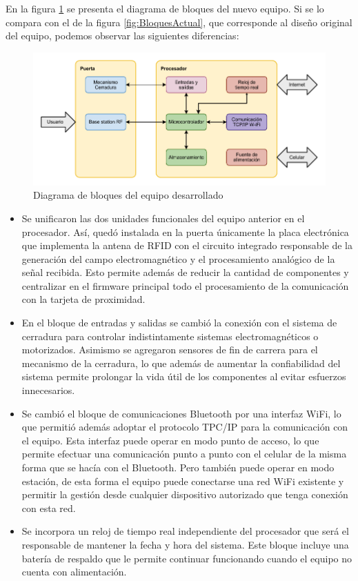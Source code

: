 En la figura \ref{fig:DiagramaBloques} se presenta el diagrama de bloques del nuevo equipo. Si se lo compara con el de la figura \ref{fig:BloquesActual}, que corresponde al diseño original del equipo, podemos observar las siguientes diferencias:

\begin{figure}[ht]
	\centering
	\includegraphics[width=\textwidth]{Figures/BloquesNuevo.pdf}
	\caption{Diagrama de bloques del equipo desarrollado}
	\label{fig:DiagramaBloques}
\end{figure}

\begin{itemize}
	\item Se unificaron las dos unidades funcionales del equipo anterior en el procesador. Así, quedó instalada en la puerta únicamente la placa electrónica que implementa la antena de RFID con el circuito integrado responsable de la generación del campo electromagnético y el procesamiento analógico de la señal recibida. Esto permite además de reducir la cantidad de componentes y centralizar en el firmware principal todo el procesamiento de la comunicación con la tarjeta de proximidad.
	\item En el bloque de entradas y salidas se cambió la conexión con el sistema de cerradura para  controlar indistintamente sistemas electromagnéticos o motorizados. Asimismo se agregaron sensores de fin de carrera para el mecanismo de la cerradura, lo que además de aumentar la confiabilidad del sistema permite prolongar la vida útil de los componentes al evitar esfuerzos innecesarios.
	\item Se cambió el bloque de comunicaciones Bluetooth por una interfaz WiFi, lo que permitió además adoptar el protocolo TPC/IP para la comunicación con el equipo. Esta interfaz puede operar en modo punto de acceso, lo que permite efectuar una comunicación punto a punto con el celular de la misma forma que se hacía con el Bluetooth. Pero también puede operar en modo estación, de esta forma el equipo puede conectarse una red WiFi existente y permitir la gestión desde cualquier dispositivo autorizado que tenga conexión con esta red.
	\item Se incorpora un reloj de tiempo real independiente del procesador que será el responsable de mantener la fecha y hora del sistema. Este bloque incluye una batería de respaldo que le permite continuar funcionando cuando el equipo no cuenta con alimentación.
\end{itemize}

